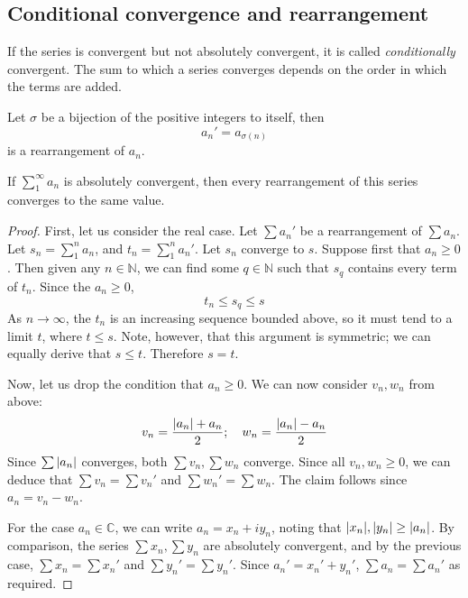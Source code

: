 \subsection{Conditional convergence and rearrangement}
If the series is convergent but not absolutely convergent, it is called \textit{conditionally} convergent.
The sum to which a series converges depends on the order in which the terms are added.
\begin{definition}
	Let \(\sigma\) be a bijection of the positive integers to itself, then
	\[
		a_n' = a_{\sigma(n)}
	\]
	is a rearrangement of \(a_n\).
\end{definition}
\begin{theorem}
	If \(\sum_1^\infty a_n\) is absolutely convergent, then every rearrangement of this series converges to the same value.
\end{theorem}
\begin{proof}
	First, let us consider the real case.
	Let \(\sum a_n'\) be a rearrangement of \(\sum a_n\).
	Let \(s_n = \sum_1^n a_n\), and \(t_n = \sum_1^n a_n'\).
	Let \(s_n\) converge to \(s\).
	Suppose first that \(a_n \geq 0\).
	Then given any \(n \in \mathbb N\), we can find some \(q \in \mathbb N\) such that \(s_q\) contains every term of \(t_n\).
	Since the \(a_n \geq 0\),
	\[
		t_n \leq s_q \leq s
	\]
	As \(n \to \infty\), the \(t_n\) is an increasing sequence bounded above, so it must tend to a limit \(t\), where \(t \leq s\).
	Note, however, that this argument is symmetric; we can equally derive that \(s \leq t\).
	Therefore \(s = t\).

	Now, let us drop the condition that \(a_n \geq 0\).
	We can now consider \(v_n, w_n\) from above:
	\[
		v_n = \frac{\abs{a_n} + a_n}{2};\quad w_n = \frac{\abs{a_n} - a_n}{2}
	\]
	Since \(\sum\abs{a_n}\) converges, both \(\sum v_n, \sum w_n\) converge.
	Since all \(v_n, w_n \geq 0\), we can deduce that \(\sum v_n = \sum v_n'\) and \(\sum w_n' = \sum w_n\).
	The claim follows since \(a_n = v_n - w_n\).

	For the case \(a_n \in \mathbb C\), we can write \(a_n = x_n + iy_n\), noting that \(\abs{x_n}, \abs{y_n} \geq \abs{a_n}\).
	By comparison, the series \(\sum x_n, \sum y_n\) are absolutely convergent, and by the previous case, \(\sum x_n = \sum x_n'\) and \(\sum y_n' = \sum y_n'\).
	Since \(a_n' = x_n' + y_n'\), \(\sum a_n = \sum a_n'\) as required.
\end{proof}
